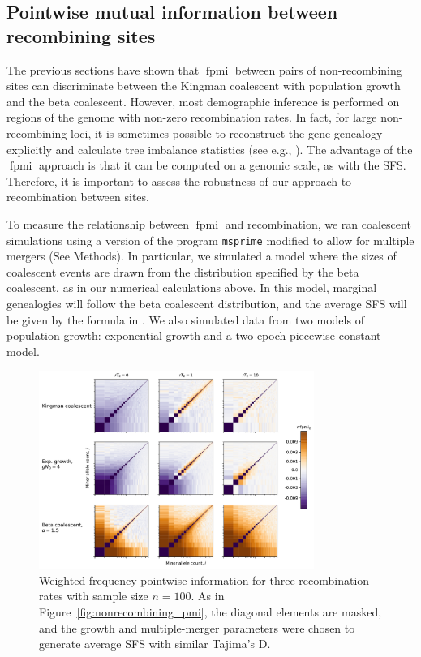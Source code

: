 \documentclass[11pt, letterpaper]{article}   	%
\newcommand{\Fig}[1]{Figure~\ref{#1}}
\DeclareMathOperator{\fpmi}{fpmi}
\begin{document}
\subsection*{Pointwise mutual information between recombining sites}

The previous sections have shown that $\fpmi$ between pairs of non-recombining sites can discriminate between the Kingman coalescent with population growth and the beta coalescent.
However, most demographic inference is performed on regions of the genome with non-zero recombination rates.
In fact, for large non-recombining loci, it is sometimes possible to reconstruct the gene genealogy explicitly and calculate tree imbalance statistics (see e.g., \cite{Seger2010}).
The advantage of the $\fpmi$ approach is that it can be computed on a genomic scale, as with the SFS.
Therefore, it is important to assess the robustness of our approach to recombination between sites.

To measure the relationship between $\fpmi$ and recombination, we ran coalescent simulations using a version of the program \texttt{msprime} \cite{KehellerEtAl201?} modified to allow for multiple mergers (See Methods).
In particular, we simulated a model where the sizes of coalescent events are drawn from the distribution specified by the beta coalescent, as in our numerical calculations above.
In this model, marginal genealogies will follow the beta coalescent distribution, and the average SFS will be given by the formula in \cite{BirknerEtAl2013}.
We also simulated data from two models of population growth: exponential growth and a two-epoch piecewise-constant model.

\begin{figure}
\centering
\includegraphics[width=0.8\textwidth]{figures/wfpmi_with_recombination.pdf}
\caption{Weighted frequency pointwise information for three recombination rates with sample size $n=100$. As in \Fig{fig:nonrecombining_pmi}, the diagonal elements are masked, and the growth and multiple-merger parameters were chosen to generate average SFS with similar Tajima's D. \label{fig:wfpmi_recombination}}
\end{figure}
\end{document}

